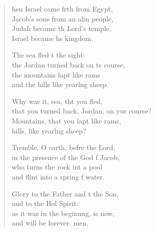 \begin{verse}
  \begin{patverse}
hen Israel came frth from Egypt,\Med\\
Jacob’s sons from an alin people,\\
Judah became th Lord’s temple,\Med\\
Israel became h\pointup{\i}s kingdom.

The sea fled t the sight:\Med\\
the Jordan turned back on \pointup{\i}ts course,\\
the mountains lapt like rams\Med\\
and the hills like yearl\pointup{\i}ng sheep.

Why was it, sea, tht you fled,\Med\\
that you turned back, Jordan, on yur course?\\
Mountains, that you lapt like rams,\Med\\
hills, like yearl\pointup{\i}ng sheep?

Tremble, O earth, befre the Lord,\Med\\
in the presence of the God f Jacob,\\
who turns the rock int a pool\Med\\
and flint into a spring f water.

Glory to the Father and t the Son,\Med\\
and to the Hol Spirit:\\
as it was in the beginn\pointup{\i}ng, is now,\Med\\
and will be forever. men.
  \end{patverse}
\end{verse}
